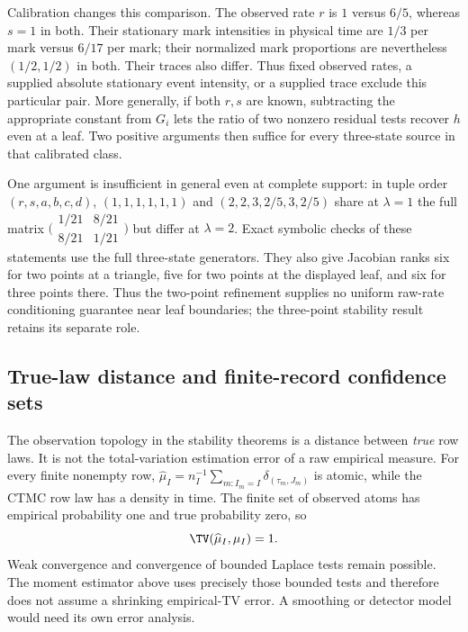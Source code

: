 Calibration changes this comparison. The observed rate $r$ is $1$ versus
$6/5$, whereas $s=1$ in both. Their stationary mark intensities in physical
time are $1/3$ per mark versus $6/17$ per mark; their normalized mark
proportions are nevertheless $(1/2,1/2)$ in both. Their traces also differ.
Thus fixed observed rates, a supplied absolute stationary event intensity,
or a supplied trace exclude this particular pair. More generally, if both
$r,s$ are known, subtracting the appropriate constant from $G_i$ lets the
ratio of two nonzero residual tests recover $h$ even at a leaf. Two positive
arguments then suffice for every three-state source in that calibrated class.

One argument is insufficient in general even at complete support: in tuple
order $(r,s,a,b,c,d)$, $(1,1,1,1,1,1)$ and $(2,2,3,2/5,3,2/5)$ share at
$\lambda=1$ the full matrix
$\bigl(\begin{smallmatrix}1/21&8/21\\8/21&1/21\end{smallmatrix}\bigr)$
but differ at $\lambda=2$. Exact symbolic checks of these statements use the
full three-state generators. They also give Jacobian ranks six for two
points at a triangle, five for two points at the displayed leaf, and six
for three points there. Thus the two-point refinement supplies no uniform
raw-rate conditioning guarantee near leaf boundaries; the three-point
stability result retains its separate role.

\subsection{True-law distance and finite-record confidence sets}
\label{subsec:empirical-topology}

The observation topology in the stability theorems is a distance between
\emph{true} row laws. It is not the total-variation estimation error of a raw
empirical measure. For every finite nonempty row,
$\widehat\mu_I=n_I^{-1}\sum_{m:I_m=I}\delta_{(\tau_m,J_m)}$ is atomic, while
the CTMC row law has a density in time. The finite set of observed atoms has
empirical probability one and true probability zero, so
\begin{equation}
 \TV(\widehat\mu_I,\mu_I)=1.\label{eq:empirical-tv-one}
\end{equation}
Weak convergence and convergence of bounded Laplace tests remain possible.
The moment estimator above uses precisely those bounded tests and therefore
does not assume a shrinking empirical-TV error. A smoothing or detector model
would need its own error analysis.


